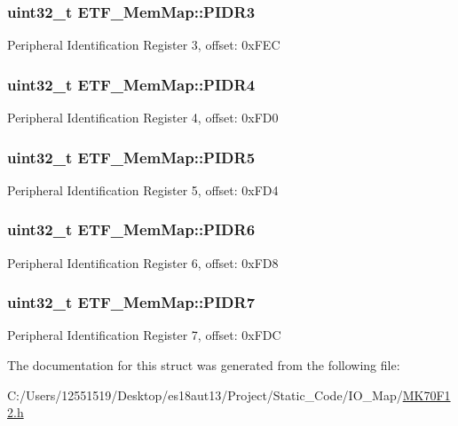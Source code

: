 \subsubsection[{P\+I\+D\+R3}]{\setlength{\rightskip}{0pt plus 5cm}uint32\+\_\+t E\+T\+F\+\_\+\+Mem\+Map\+::\+P\+I\+D\+R3}\label{struct_e_t_f___mem_map_a1132bf279f207a39e89f2fab3d384308}
Peripheral Identification Register 3, offset\+: 0x\+F\+E\+C \hypertarget{struct_e_t_f___mem_map_a955a81d9c5e73e129ca965fa226bfde8}{}
\subsubsection[{P\+I\+D\+R4}]{\setlength{\rightskip}{0pt plus 5cm}uint32\+\_\+t E\+T\+F\+\_\+\+Mem\+Map\+::\+P\+I\+D\+R4}\label{struct_e_t_f___mem_map_a955a81d9c5e73e129ca965fa226bfde8}
Peripheral Identification Register 4, offset\+: 0x\+F\+D0 \hypertarget{struct_e_t_f___mem_map_a3054ae260a217f950e2c7793ff27855d}{}
\subsubsection[{P\+I\+D\+R5}]{\setlength{\rightskip}{0pt plus 5cm}uint32\+\_\+t E\+T\+F\+\_\+\+Mem\+Map\+::\+P\+I\+D\+R5}\label{struct_e_t_f___mem_map_a3054ae260a217f950e2c7793ff27855d}
Peripheral Identification Register 5, offset\+: 0x\+F\+D4 \hypertarget{struct_e_t_f___mem_map_a3448111767c72273ead546c08f49047b}{}
\subsubsection[{P\+I\+D\+R6}]{\setlength{\rightskip}{0pt plus 5cm}uint32\+\_\+t E\+T\+F\+\_\+\+Mem\+Map\+::\+P\+I\+D\+R6}\label{struct_e_t_f___mem_map_a3448111767c72273ead546c08f49047b}
Peripheral Identification Register 6, offset\+: 0x\+F\+D8 \hypertarget{struct_e_t_f___mem_map_a53393d8ce48a43bed1d5568561776a5c}{}
\subsubsection[{P\+I\+D\+R7}]{\setlength{\rightskip}{0pt plus 5cm}uint32\+\_\+t E\+T\+F\+\_\+\+Mem\+Map\+::\+P\+I\+D\+R7}\label{struct_e_t_f___mem_map_a53393d8ce48a43bed1d5568561776a5c}
Peripheral Identification Register 7, offset\+: 0x\+F\+D\+C 

The documentation for this struct was generated from the following file\+:\begin{DoxyCompactItemize}
\item 
C\+:/\+Users/12551519/\+Desktop/es18aut13/\+Project/\+Static\+\_\+\+Code/\+I\+O\+\_\+\+Map/\hyperlink{_m_k70_f12_8h}{M\+K70\+F12.\+h}\end{DoxyCompactItemize}
